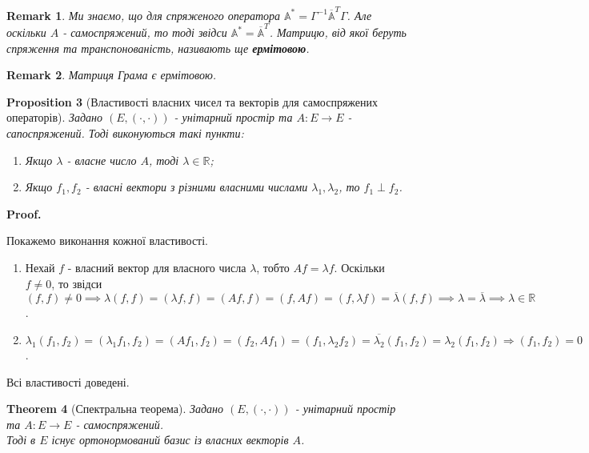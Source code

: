 \documentclass[a4paper, 10pt]{article}
\makeatletter
\theoremstyle{theoremdd}
\newtheorem{theorem}{Theorem}[subsection]
\newtheorem{proposition}[theorem]{Proposition}
\newtheorem{remark}[theorem]{Remark}
\renewenvironment{proof}[1][Proof.\\]{\par
\pushQED{\hfill \qed}%
\normalfont \topsep6\p@\@plus6\p@\relax
\trivlist
\item\relax
{\bfseries
#1\@addpunct{.}}\hspace\labelsep\ignorespaces
}{%
\popQED\endtrivlist\@endpefalse
}
\makeatother
\begin{document}
\begin{remark}
Ми знаємо, що для спряженого оператора $\mathbb{A}^* = \Gamma^{-1} \overline{\mathbb{A}}^T \Gamma$. Але оскільки $A$ - самоспряжений, то тоді звідси $\mathbb{A}^* = \overline{\mathbb{A}}^T$. Матрицю, від якої беруть спряження та транспонованість, називають ще \textbf{ермітовою}.
\end{remark}

\begin{remark}
Матриця Грама є ермітовою.
\end{remark}

\begin{proposition}[Властивості власних чисел та векторів для самоспряжених операторів]
Задано $(E,(\cdot,\cdot))$ - унітарний простір та $A \colon E \to E$ - сапоспряжений. Тоді виконуються такі пункти:
\begin{enumerate}[nosep,wide=0pt,label={\arabic*)}]
\item Якщо $\lambda$ - власне число $A$, тоді $\lambda \in \mathbb{R}$;
\item Якщо $f_1,f_2$ - власні вектори з різними власними числами $\lambda_1, \lambda_2$, то $f_1 \perp f_2$.
\end{enumerate}
\end{proposition}

\begin{proof}
Покажемо виконання кожної властивості.
\begin{enumerate}[topsep=-\parskip, wide=0pt, label={\arabic*)}]
\item Нехай $f$ - власний вектор для власного числа $\lambda$, тобто $Af = \lambda f$. Оскільки $f \neq 0$, то звідси $(f,f) \neq 0 \implies \lambda (f,f) = (\lambda f, f) = (Af,f) = (f,Af) = (f, \lambda f) = \overline{\lambda} (f,f) \implies \lambda = \overline{\lambda} \implies \lambda \in \mathbb{R}$.
\item $\lambda_1 (f_1,f_2) = (\lambda_1 f_1, f_2) = (Af_1, f_2) = (f_2, Af_1) = (f_1, \lambda_2 f_2) = \overline{\lambda_2} (f_1,f_2) = \lambda_2 (f_1,f_2) \Rightarrow (f_1,f_2) = 0$.
\end{enumerate}
Всі властивості доведені.
\end{proof}

\begin{theorem}[Спектральна теорема]
Задано $(E,(\cdot,\cdot))$ - унітарний простір та $A \colon E \to E$ - самоспряжений.\\
Тоді в $E$ існує ортонормований базис із власних векторів $A$.
\end{theorem}
\end{document}
